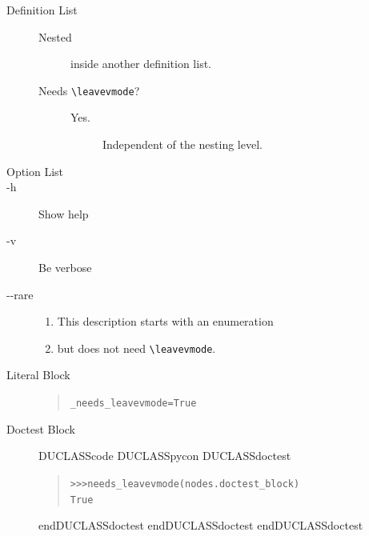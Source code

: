 \documentclass[a4paper]{article}
\newenvironment{DUclass}[1]%
    {%
     \def\DocutilsClassFunctionName{DUCLASS#1}
     \csname \DocutilsClassFunctionName \endcsname}%
    {\csname end\DocutilsClassFunctionName \endcsname}%
\providecommand*{\DUoptionlistlabel}[1]{\bfseries #1 \hfill}
\newenvironment{DUoptionlist}{%
    \list{}{\setlength{\labelwidth}{\DUoptionlistindent}
            \setlength{\rightmargin}{1cm}
            \setlength{\leftmargin}{\rightmargin}
            \addtolength{\leftmargin}{\labelwidth}
            \addtolength{\leftmargin}{\labelsep}
            \renewcommand{\makelabel}{\DUoptionlistlabel}}
  }
  {\endlist}
\begin{document}
\begin{description}
\item[{Definition List}] \leavevmode
\begin{description}
\item[{Nested}] 
inside another definition list.

\item[{Needs \texttt{\textbackslash{}leavevmode}?}] \leavevmode
\begin{description}
\item[{Yes.}] 
Independent of the nesting level.
\end{description}
\end{description}

\item[{Option List}] \leavevmode
\begin{DUoptionlist}
\item[-h]  Show help
\item[-v]  Be verbose
\item[-{}-rare]  
\begin{enumerate}
\renewcommand{\labelenumi}{\alph{enumi})}
\item This description starts with an enumeration

\item but does not need \texttt{\textbackslash{}leavevmode}.
\end{enumerate}
\end{DUoptionlist}

\item[{Literal Block}] \leavevmode
\begin{quote}
\begin{alltt}
_needs_leavevmode  = True
\end{alltt}
\end{quote}

\item[{Doctest Block}] \leavevmode
\begin{DUclass}{code}
\begin{DUclass}{pycon}
\begin{DUclass}{doctest}
\begin{quote}
\begin{alltt}
>>> needs_leavevmode(nodes.doctest_block)
True
\end{alltt}
\end{quote}
\end{DUclass}
\end{DUclass}
\end{DUclass}


\end{description}
\end{document}
